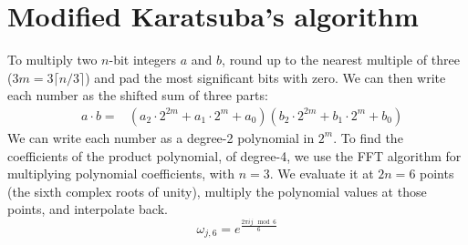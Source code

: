 \documentclass[12pt]{article}
\begin{document}
\setcounter{section}{0}
\section{Modified Karatsuba's algorithm}

To multiply two $n$-bit integers $a$ and $b$,
round up to the nearest multiple of
three ($3m = 3\lceil n/3 \rceil$) and pad the most significant bits with
zero. We can then write each number as the shifted sum of three parts:
\begin{eqnarray*}
& a\cdot b = & (a_2\cdot 2^{2m} + a_1\cdot 2^{m} + a_0)
               (b_2\cdot 2^{2m} + b_1\cdot 2^{m} + b_0)
\end{eqnarray*}
We can write each number as a degree-2 polynomial in $2^m$.
To find the coefficients of the product polynomial, of degree-4,
we use the FFT algorithm for multiplying polynomial coefficients,
with $n=3$.
We evaluate it at $2n=6$ points (the sixth complex roots of unity),
multiply the polynomial values at those points, and interpolate back.
\begin{displaymath}
\omega_{j,6} = e^{\frac{2\pi i j \mod{6}}{6}}
\end{displaymath}
\end{document}
